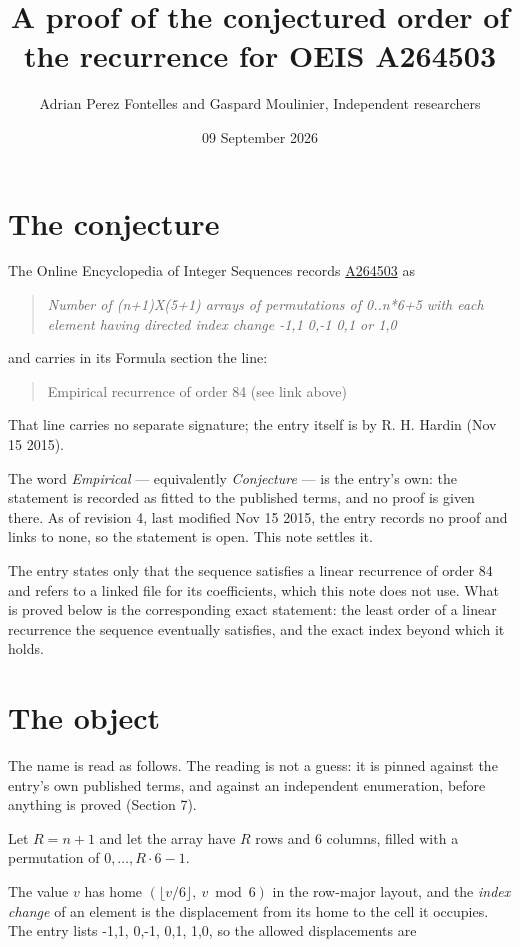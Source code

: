\documentclass[11pt]{article}
\title{A proof of the conjectured order of the recurrence for OEIS A264503}
\author{Adrian Perez Fontelles and Gaspard Moulinier, Independent researchers}
\date{09 September 2026}
\theoremstyle{definition}
\begin{document}
\maketitle
\section{The conjecture}

The Online Encyclopedia of Integer Sequences records \href{https://oeis.org/A264503}{A264503} as

\begin{quote}\itshape Number of (n+1)X(5+1) arrays of permutations of 0..n*6+5 with each element having directed index change -1,1 0,-1 0,1 or 1,0\end{quote}

and carries in its Formula section the line:

\begin{quote}\ttfamily Empirical recurrence of order 84 (see link above)\end{quote}

That line carries no separate signature; the entry itself is by R. H. Hardin (Nov 15 2015).

The word {\itshape Empirical} --- equivalently {\itshape Conjecture} --- is the entry's own: the statement is recorded as fitted to the published terms, and no proof is given there. As of revision 4, last modified Nov 15 2015, the entry records no proof and links to none, so the statement is open. This note settles it.

The entry states only that the sequence satisfies a linear recurrence of order $84$ and refers to a linked file for its coefficients, which this note does not use. What is proved below is the corresponding exact statement: the least order of a linear recurrence the sequence eventually satisfies, and the exact index beyond which it holds.

\section{The object}

The name is read as follows. The reading is not a guess: it is pinned against the entry's own published terms, and against an independent enumeration, before anything is proved (Section 7).

Let $R = n + 1$ and let the array have $R$ rows and $6$ columns, filled with a permutation of $0,\dots,R\cdot6-1$.

The value $v$ has home $(\lfloor v/6\rfloor,\ v \bmod 6)$ in the row-major layout, and the {\itshape index change} of an element is the displacement from its home to the cell it occupies. The entry lists -1,1, 0,-1, 0,1, 1,0, so the allowed displacements are
\end{document}
